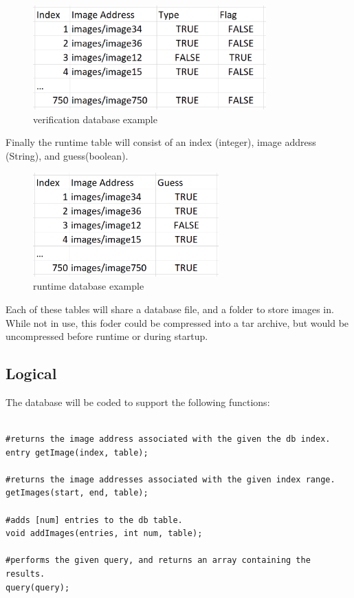\begin{figure}[h]
\caption{verification database example}
\centering
\includegraphics[height=4cm]{verificationdb}
\end{figure}


Finally the runtime table will consist of an index (integer), image address (String), and guess(boolean).

\begin{figure}[h]
\caption{runtime database example}
\centering
\includegraphics[height=4cm]{runtimedb}
\end{figure}

Each of these tables will share a database file, and a folder to store images in.
While not in use, this foder could be compressed into a tar archive, but would be uncompressed before runtime or during startup.




\subsection{Logical}

The database will be coded to support the following functions:

\begin{verbatim}

#returns the image address associated with the given the db index.
entry getImage(index, table);

#returns the image addresses associated with the given index range.
getImages(start, end, table);

#adds [num] entries to the db table.
void addImages(entries, int num, table);

#performs the given query, and returns an array containing the results.
query(query);

\end{verbatim}

